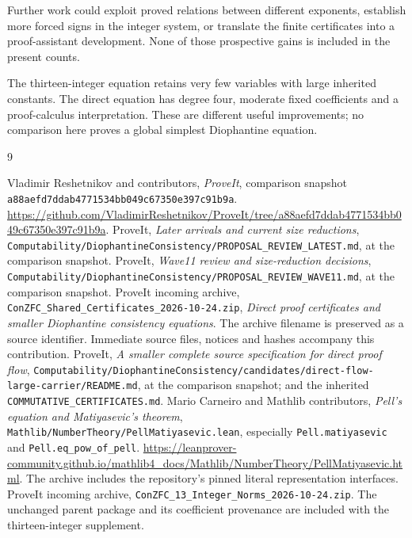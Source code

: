 \documentclass[11pt,letterpaper]{article}
\newcommand{\file}[1]{\nolinkurl{#1}}
\newcommand{\repoPin}{\texttt{a88aefd7ddab4771534bb049c67350e397c91b9a}}
\begin{document}
Further work could exploit proved relations
between different exponents, establish more
forced signs in the integer system, or translate
the finite certificates into a proof-assistant
development. None of those prospective gains
is included in the present counts.

The thirteen-integer equation retains very few
variables with large inherited constants. The
direct equation has degree four, moderate fixed
coefficients and a proof-calculus interpretation.
These are different useful improvements; no
comparison here proves a global simplest
Diophantine equation.

\appendix


\begin{thebibliography}{9}
\small\raggedright
{}
Vladimir Reshetnikov and contributors,
\emph{ProveIt}, comparison snapshot \repoPin.
\url{https://github.com/VladimirReshetnikov/ProveIt/tree/a88aefd7ddab4771534bb049c67350e397c91b9a}.
ProveIt, \emph{Later arrivals and current size reductions},
\file{Computability/DiophantineConsistency/PROPOSAL_REVIEW_LATEST.md},
at the comparison snapshot.
ProveIt, \emph{Wave11 review and size-reduction decisions},
\file{Computability/DiophantineConsistency/PROPOSAL_REVIEW_WAVE11.md},
at the comparison snapshot.
ProveIt incoming archive,
\file{ConZFC_Shared_Certificates_2026-10-24.zip},
\emph{Direct proof certificates and smaller Diophantine consistency equations}.
The archive filename is preserved as a source identifier.
Immediate source files, notices and hashes accompany this contribution.
ProveIt, \emph{A smaller complete source specification for direct proof flow},
\file{Computability/DiophantineConsistency/candidates/direct-flow-large-carrier/README.md},
at the comparison snapshot; and the inherited
\file{COMMUTATIVE_CERTIFICATES.md}.
Mario Carneiro and Mathlib contributors,
\emph{Pell's equation and Matiyasevic's theorem},
\file{Mathlib/NumberTheory/PellMatiyasevic.lean},
especially \file{Pell.matiyasevic} and
\file{Pell.eq_pow_of_pell}.
\url{https://leanprover-community.github.io/mathlib4_docs/Mathlib/NumberTheory/PellMatiyasevic.html}.
The archive includes the repository's pinned literal representation interfaces.
ProveIt incoming archive,
\file{ConZFC_13_Integer_Norms_2026-10-24.zip}.
The unchanged parent package and its coefficient provenance
are included with the thirteen-integer supplement.
\end{thebibliography}
\end{document}
